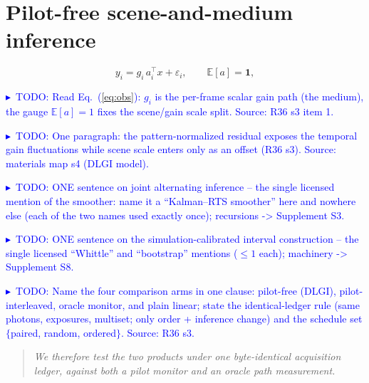 \documentclass[10pt,twocolumn]{article}
\newcommand{\CAMPAIGN}[1]{\textcolor{orange}{$\langle$C:\,#1$\rangle$}}
\newcommand{\TODOc}[1]{\par\smallskip\noindent\textcolor{blue}{\footnotesize$\blacktriangleright$~TODO: #1}\par\smallskip}
\begin{document}
\section{Pilot-free scene-and-medium inference}
\label{sec:decode}

\begin{equation}
  y_i=g_i\,a_i^{\top}x+\varepsilon_i,\qquad \mathbb{E}[a]=\mathbf{1},
  \label{eq:obs}
\end{equation}
\TODOc{Read Eq.~(\ref{eq:obs}): $g_i$ is the per-frame scalar gain path (the
medium), the gauge $\mathbb{E}[a]=1$ fixes the scene/gain scale split. Source:
R36 s3 item 1.}
\TODOc{One paragraph: the pattern-normalized residual exposes the temporal gain
fluctuations while scene scale enters only as an offset (R36 s3). Source:
materials map s4 (DLGI model).}
\TODOc{ONE sentence on joint alternating inference -- the single licensed mention
of the smoother: name it a ``Kalman--RTS smoother'' here and nowhere else (each of
the two names used exactly once); recursions -> Supplement S3.}
\TODOc{ONE sentence on the simulation-calibrated interval construction -- the
single licensed ``Whittle'' and ``bootstrap'' mentions ($\le 1$ each); machinery
-> Supplement S8.}
\TODOc{Name the four comparison arms in one clause: pilot-free (DLGI),
pilot-interleaved, oracle monitor, and plain linear; state the identical-ledger
rule (same photons, exposures, multiset; only order + inference change) and the
schedule set $\{$paired, random, ordered$\}$. Source: R36 s3.}

\begin{quote}\itshape\small
We therefore test the two products under one byte-identical acquisition ledger,
against both a pilot monitor and an oracle path measurement.
\end{quote}

\end{document}
